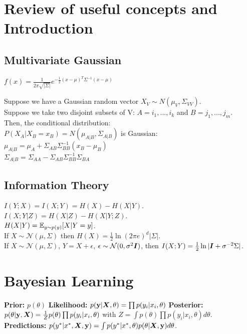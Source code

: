 \section{Review of useful concepts and Introduction}
\subsection{Multivariate Gaussian}
$f(x) = \frac{1}{2\pi \sqrt{|\Sigma|}} e^{- \frac{1}{2} (x-\mu)^T \Sigma^{-1} (x-\mu)}$

Suppose we have a Gaussian random vector $X_V \sim N(\mu_V, \Sigma_{VV})$.\\
Suppose we take two disjoint subsets of V: $A={i_1,...,i_k}$ and $B={j_1,...,j_m}$.\\
Then, the conditional distribution: \\
$P(X_A|X_B=x_B)=N(\mu_{A|B}, \Sigma_{A|B})$ is Gaussian:\\
$\mu_{A|B}=\mu_A+\Sigma_{AB}\Sigma^{-1}_{BB}(x_B-\mu_B)$\\
$\Sigma_{A|B}=\Sigma_{AA}-\Sigma_{AB}\Sigma^{-1}_{BB}\Sigma_{BA}$

\subsection{Information Theory}
$I(Y;X) = I(X;Y) = H(X) - H(X|Y)$.\\
$I(X;Y|Z) = H(X|Z) - H(X|Y;Z)$.\\
$H(X|Y) = \mathbb{E}_{y\sim p(y)}[X|Y=y]$.\\
If $X\sim\mathcal{N}(\mu, \Sigma)$ then $H(X) = \frac{1}{2}\ln(2\pi e)^d|\Sigma|$.\\
If $X\sim\mathcal{N}(\mu, \Sigma)$, $Y = X + \epsilon$, $\epsilon\sim\mathcal{N}(0,\sigma^2{\bm{I}})$, then $I(X;Y) = \frac{1}{2}\ln|{\bm{I}}+\sigma^{-2}\Sigma|$.

\section{Bayesian Learning}
\textbf{Prior:} $p(\theta)$
\textbf{Likelihood:} $p({\mathbf{y}}|{\bm{X}},\theta) = \prod p(y_i|x_i,\theta)$
\textbf{Posterior:} $p(\theta|{\mathbf{y}},{\bm{X}}) = \frac{1}{Z}p(\theta)\prod p(y_i|x_i, \theta)$ with $Z = \int p(\theta)\prod p(y_i|x_i, \theta) d\theta$.
\textbf{Predictions:} $p(y^*|x^*,{\bm{X}},{\mathbf{y}}) = \int p(y^*|x^*,\theta)p(\theta|{\bm{X}}, {\mathbf{y}}) d\theta$. 

